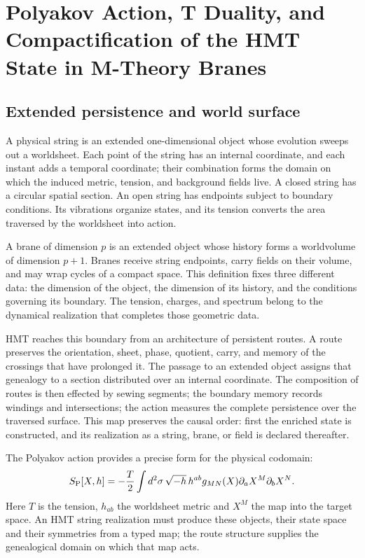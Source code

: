 \chapter{Polyakov Action, T Duality, and Compactification of the HMT State in M-Theory Branes}
\label{chap:teoria-m}

\section{Extended persistence and world surface}

A physical string is an extended one-dimensional object whose evolution sweeps out
a worldsheet. Each point of the string has an internal coordinate,
and each instant adds a temporal coordinate; their combination forms
the domain on which the induced metric, tension, and background fields
live. A closed string has a circular spatial section. An open string
has endpoints subject to boundary conditions. Its vibrations organize
states, and its tension converts the area traversed by the worldsheet into
action.

A brane of dimension \(p\) is an extended object whose history forms a
worldvolume of dimension \(p+1\). Branes receive string endpoints,
carry fields on their volume, and may wrap cycles of a compact
space. This definition fixes three different data: the dimension of the object,
the dimension of its history, and the conditions governing its boundary. The
tension, charges, and spectrum belong to the dynamical realization that
completes those geometric data.

HMT reaches this boundary from an architecture of persistent routes. A
route preserves the orientation, sheet, phase, quotient, carry, and memory of the
crossings that have prolonged it. The passage to an extended object assigns that
genealogy to a section distributed over an internal coordinate. The
composition of routes is then effected by sewing segments; the boundary
memory records windings and intersections; the action measures the
complete persistence over the traversed surface. This map preserves the
causal order: first the enriched state is constructed, and its realization
as a string, brane, or field is declared thereafter.

The Polyakov action provides a precise form for the physical codomain:
\[
 S_{\rm P}[X,h]
 =-\frac{T}{2}\int d^2\sigma\,
 \sqrt{-h}\,h^{ab}g_{MN}(X)
 \partial_aX^M\partial_bX^N.
\]
Here \(T\) is the tension, \(h_{ab}\) the worldsheet metric and
\(X^M\) the map into the target space. An HMT string realization must
produce these objects, their state space and their symmetries from a typed
map; the route structure supplies the genealogical domain on which
that map acts.

